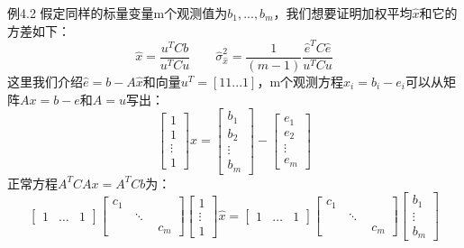 	例4.2 \quad 假定同样的标量变量m个观测值为$b_1,...,b_m$，我们想要证明加权平均$\hat{x}$和它的方差如下：
	\begin{equation}
	\hat{x}=\frac{u^TCb}{u^TCu}  
	\qquad \hat{\sigma}^{2}_{\hat{x}}=\frac{1}{(m-1)}\frac{\hat{e}^TC\hat{e}}{u^TCu}
	\end{equation}
	这里我们介绍$\hat{e}=b-A\hat{x}$和向量$u^T=[1 1 ... 1]$，m个观测方程$x_i=b_i-e_i$可以从矩阵$Ax=b-e$和$A=u$写出：
	\begin{equation*}
	\begin{bmatrix}
	1 \\ 1 \\ \vdots \\1
	\end{bmatrix}
	x=
	\begin{bmatrix}
	b_1 \\ b_2 \\ \vdots \\ b_m
	\end{bmatrix}
	-
	\begin{bmatrix}
	e_1 \\ e_2 \\ \vdots \\ e_m
	\end{bmatrix}
	\end{equation*}
	正常方程$A^TCAx=A^TCb$为：
	\begin{equation*}
	\begin{bmatrix}
	1 & \dots & 1
	\end{bmatrix}
	\begin{bmatrix}
	c_1 & \quad  &\quad \\
    \quad & \ddots & \quad \\
	\quad & \quad  & c_m
	\end{bmatrix}
	\begin{bmatrix}
	1 \\ \vdots \\ 1
	\end{bmatrix}
	\hat{x}=
	\begin{bmatrix}
	1 & \dots & 1
	\end{bmatrix}
	\begin{bmatrix}
	c_1 & \quad  &\quad \\
	\quad & \ddots & \quad \\
	\quad & \quad  & c_m
	\end{bmatrix}
	\begin{bmatrix}
	b_1 \\ \vdots \\ b_m
	\end{bmatrix}
	\end{equation*}
	
